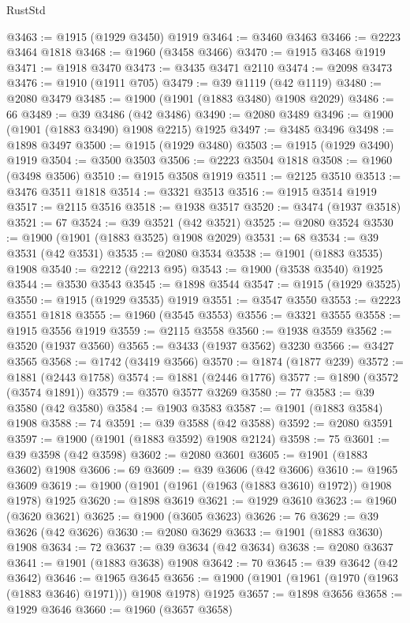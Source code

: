 \begin{lexlean}{RustStd}
\begin{coremodule}
{\begin{coremodule}
{{{{{{{{{{{{{{{{{{{{{{{{{{{{{{{{{{{{{{{{{{{@3463 := @1915 (@1929 @3450) @1919
@3464 := @3460 @3463
@3466 := @2223 @3464 @1818
@3468 := @1960 (@3458 @3466)
@3470 := @1915 @3468 @1919
@3471 := @1918 @3470
@3473 := @3435 @3471 @2110
@3474 := @2098 @3473
@3476 := @1910 (@1911 @705)
@3479 := @39 @1119 (@42 @1119)
@3480 := @2080 @3479
@3485 := @1900 (@1901 (@1883 @3480) @1908 @2029)
@3486 := 66
@3489 := @39 @3486 (@42 @3486)
@3490 := @2080 @3489
@3496 := @1900 (@1901 (@1883 @3490) @1908 @2215) @1925
@3497 := @3485 @3496
@3498 := @1898 @3497
@3500 := @1915 (@1929 @3480)
@3503 := @1915 (@1929 @3490) @1919
@3504 := @3500 @3503
@3506 := @2223 @3504 @1818
@3508 := @1960 (@3498 @3506)
@3510 := @1915 @3508 @1919
@3511 := @2125 @3510
@3513 := @3476 @3511 @1818
@3514 := @3321 @3513
@3516 := @1915 @3514 @1919
@3517 := @2115 @3516
@3518 := @1938 @3517
@3520 := @3474 (@1937 @3518)
@3521 := 67
@3524 := @39 @3521 (@42 @3521)
@3525 := @2080 @3524
@3530 := @1900 (@1901 (@1883 @3525) @1908 @2029)
@3531 := 68
@3534 := @39 @3531 (@42 @3531)
@3535 := @2080 @3534
@3538 := @1901 (@1883 @3535) @1908
@3540 := @2212 (@2213 @95)
@3543 := @1900 (@3538 @3540) @1925
@3544 := @3530 @3543
@3545 := @1898 @3544
@3547 := @1915 (@1929 @3525)
@3550 := @1915 (@1929 @3535) @1919
@3551 := @3547 @3550
@3553 := @2223 @3551 @1818
@3555 := @1960 (@3545 @3553)
@3556 := @3321 @3555
@3558 := @1915 @3556 @1919
@3559 := @2115 @3558
@3560 := @1938 @3559
@3562 := @3520 (@1937 @3560)
@3565 := @3433 (@1937 @3562) @3230
@3566 := @3427 @3565
@3568 := @1742 (@3419 @3566)
@3570 := @1874 (@1877 @239)
@3572 := @1881 (@2443 @1758)
@3574 := @1881 (@2446 @1776)
@3577 := @1890 (@3572 (@3574 @1891))
@3579 := @3570 @3577 @3269
@3580 := 77
@3583 := @39 @3580 (@42 @3580)
@3584 := @1903 @3583
@3587 := @1901 (@1883 @3584) @1908
@3588 := 74
@3591 := @39 @3588 (@42 @3588)
@3592 := @2080 @3591
@3597 := @1900 (@1901 (@1883 @3592) @1908 @2124)
@3598 := 75
@3601 := @39 @3598 (@42 @3598)
@3602 := @2080 @3601
@3605 := @1901 (@1883 @3602) @1908
@3606 := 69
@3609 := @39 @3606 (@42 @3606)
@3610 := @1965 @3609
@3619 := @1900 (@1901 (@1961 (@1963 (@1883 @3610) @1972)) @1908 @1978) @1925
@3620 := @1898 @3619
@3621 := @1929 @3610
@3623 := @1960 (@3620 @3621)
@3625 := @1900 (@3605 @3623)
@3626 := 76
@3629 := @39 @3626 (@42 @3626)
@3630 := @2080 @3629
@3633 := @1901 (@1883 @3630) @1908
@3634 := 72
@3637 := @39 @3634 (@42 @3634)
@3638 := @2080 @3637
@3641 := @1901 (@1883 @3638) @1908
@3642 := 70
@3645 := @39 @3642 (@42 @3642)
@3646 := @1965 @3645
@3656 := @1900 (@1901 (@1961 (@1970 (@1963 (@1883 @3646) @1971))) @1908 @1978) @1925
@3657 := @1898 @3656
@3658 := @1929 @3646
@3660 := @1960 (@3657 @3658)
}}}}}}}}}}}}}}}}}}}}}}}}}}}}}}}}}}}}}}}}}}}
\end{coremodule}}
\end{coremodule}
\end{lexlean}
